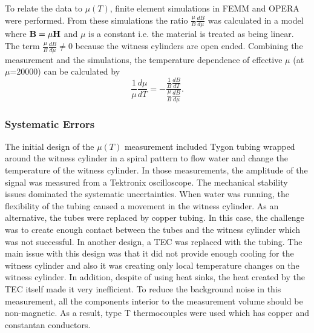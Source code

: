 \documentclass[review]{elsarticle}
\begin{document}
To relate the data to $\mu(T)$, finite element simulations in FEMM and
OPERA were performed.  From these simulations the ratio $\frac{\mu}{B}
\frac{dB}{d\mu}$ was calculated in a model where $\bold{B}=\mu
\bold{H}$ and $\mu$ is a constant i.e. the material is treated as
being linear. The term $\frac{\mu}{B}\frac{dB}{d\mu}\neq 0$ because
the witness cylinders are open ended. Combining the measurement and
the simulations, the temperature dependence of effective $\mu$ (at
$\mu$=20000) can be calculated by
\begin{equation}
\frac{1}{\mu}\frac{d\mu}{dT}= -\frac{\frac{1}{B}\frac{dB}{dT}}{\frac{\mu}{B}\frac{dB}{d\mu}}.
\end{equation}

\subsubsection{Systematic Errors}
The initial design of the $\mu(T)$ measurement included Tygon tubing wrapped around the witness cylinder in a spiral pattern to flow water and change the temperature of the witness cylinder. In those measurements, the amplitude of the signal was measured  from a Tektronix oscilloscope. The mechanical stability issues dominated the systematic uncertainties. When water was running, the flexibility of the tubing caused a movement in the witness cylinder. As an alternative, the tubes were replaced by copper tubing. In this case, the challenge was to create enough contact between the tubes and the witness cylinder which was not successful. In another design, a TEC was replaced with the tubing. The main issue with this design was that it did not provide enough cooling for the witness cylinder and also it was creating only local temperature changes on the witness cylinder. In addition, despite of using heat sinks, the heat created by the TEC itself made it very inefficient. To reduce the background noise in this measurement, all the components interior to the measurement volume should be non-magnetic. As a result, type T thermocouples were used which has copper and constantan conductors.


\end{document}
